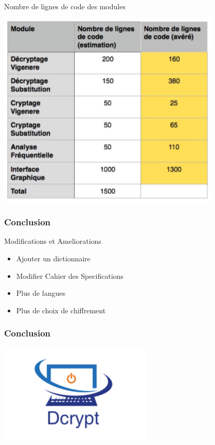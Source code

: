 \documentclass[10pt,xcolor=table]{beamer}
\begin{document}
\begin{frame}
	\begin{block}{Nombre de lignes de code des modules}
	\begin{center}
		\includegraphics[scale =0.3]{tabl.png} \\ 
	\end{center}
	\end{block}
\end{frame}
\begin{frame}
  \frametitle{Conclusion}
	\begin{block}{Modifications et Ameliorations}
	\begin{itemize} \pause
		\item Ajouter un dictionnaire\\
		\item Modifier Cahier des Specifications\\ \pause
		\item Plus de langues\\ 
		\item Plus de choix de chiffrement
	\end{itemize}
	\end{block}
\end{frame}
\begin{frame}
  \frametitle{Conclusion}
\begin{center}
\includegraphics[scale =0.5]{logo.png}
\end{center}
\end{frame}
\end{document}
